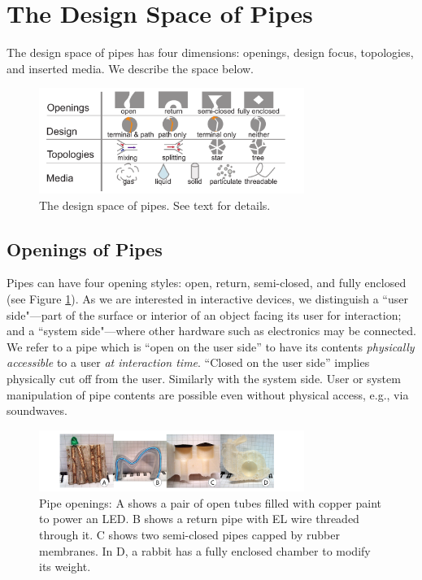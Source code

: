 \section{The Design Space of Pipes}
The design space of pipes has four dimensions: openings, design focus, topologies, and inserted media.  We describe the space below.

\begin{figure}[h!]
\centering
    \includegraphics[width=3.4in]{figures/tubespace.pdf}
\caption{The design space of pipes.  See text for details.}
\label{fig:pipespace}
\end{figure}

\subsection{Openings of Pipes}

Pipes can have four opening styles: open, return, semi-closed, and fully enclosed (see Figure \ref{fig:pipespace}).  As we are interested in interactive devices, we distinguish a ``user side"---part of the surface or interior of an object facing its user for interaction; and a ``system side"---where other hardware such as electronics may be connected.  We refer to a pipe which is ``open on the user side'' to have its contents \emph{physically accessible} to a user \emph{at interaction time}.  ``Closed on the user side'' implies physically cut off from the user.  Similarly with the system side.  User or system manipulation of pipe contents are possible even without physical access, e.g., via soundwaves.

\begin{figure}[h]
\centering
    \includegraphics[width=3.4in]{figures/types.png}
\caption{Pipe openings: A shows a pair of open tubes filled with copper paint to power an LED.  B shows a return pipe with EL wire threaded through it.  C shows two semi-closed pipes capped by rubber membranes.  In D, a rabbit has a fully enclosed chamber to modify its weight. }
\label{fig:openings}
\end{figure}

